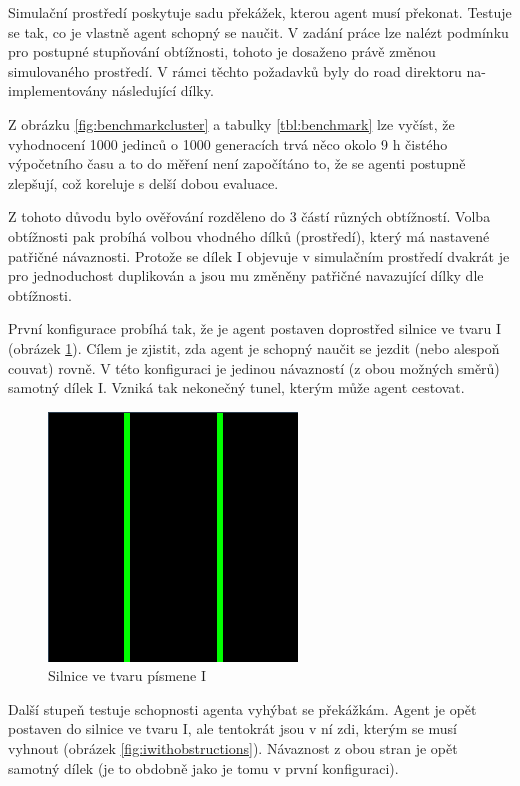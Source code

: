 \label{sec:simulationEnvironment}
Simulační prostředí poskytuje sadu překážek, kterou agent musí překonat. Testuje se tak, co je vlastně agent schopný se naučit. V zadání práce lze nalézt podmínku pro postupné stupňování obtížnosti, tohoto je dosaženo právě změnou simulovaného prostředí. V rámci těchto požadavků byly do road direktoru na-implementovány následující dílky.

Z obrázku \ref{fig:benchmarkcluster} a tabulky \ref{tbl:benchmark} lze vyčíst, že vyhodnocení 1000 jedinců o 1000 generacích trvá něco okolo 9 h čistého výpočetního času a to do měření není započítáno to, že se agenti postupně zlepšují, což koreluje s delší dobou evaluace. 

Z tohoto důvodu bylo ověřování rozděleno do 3 částí různých obtížností. Volba obtížnosti pak probíhá volbou vhodného dílků (prostředí), který má nastavené patřičné návaznosti. Protože se dílek I objevuje v simulačním prostředí dvakrát je pro jednoduchost duplikován a jsou mu změněny patřičné navazující dílky dle obtížnosti.

První konfigurace probíhá tak, že je agent postaven doprostřed silnice ve tvaru I (obrázek \ref{fig:i}). Cílem je zjistit, zda agent je schopný naučit se jezdit (nebo alespoň couvat) rovně. V této konfiguraci je jedinou návazností (z obou možných směrů) samotný dílek I. Vzniká tak nekonečný tunel, kterým může agent cestovat.

\begin{figure}[H]
	\centering
	\includegraphics[scale=0.5]{pieces/I}
	\caption{Silnice ve tvaru písmene I}
	\label{fig:i}
\end{figure}
  
Další stupeň testuje schopnosti agenta vyhýbat se překážkám. Agent je opět postaven do silnice ve tvaru I, ale tentokrát jsou v ní zdi, kterým se musí vyhnout (obrázek \ref{fig:iwithobstructions}). Návaznost z obou stran je opět samotný dílek (je to obdobně jako je tomu v první konfiguraci).

